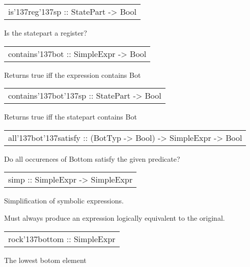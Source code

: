 \begin{haddockdesc}
\item[\begin{tabular}{@{}l}
is{\char '137}reg{\char '137}sp :: StatePart -> Bool
\end{tabular}]
{\haddockbegindoc
Is the statepart a register?\par}
\end{haddockdesc}
\begin{haddockdesc}
\item[\begin{tabular}{@{}l}
contains{\char '137}bot :: SimpleExpr -> Bool
\end{tabular}]
{\haddockbegindoc
Returns true iff the expression contains Bot\par}
\end{haddockdesc}
\begin{haddockdesc}
\item[\begin{tabular}{@{}l}
contains{\char '137}bot{\char '137}sp :: StatePart -> Bool
\end{tabular}]
{\haddockbegindoc
Returns true iff the statepart contains Bot\par}
\end{haddockdesc}
\begin{haddockdesc}
\item[\begin{tabular}{@{}l}
all{\char '137}bot{\char '137}satisfy :: (BotTyp -> Bool) -> SimpleExpr -> Bool
\end{tabular}]
{\haddockbegindoc
Do all occurences of Bottom satisfy the given predicate?\par}
\end{haddockdesc}
\begin{haddockdesc}
\item[\begin{tabular}{@{}l}
simp :: SimpleExpr -> SimpleExpr
\end{tabular}]
{\haddockbegindoc
Simplification of symbolic expressions. \par
Must always produce an expression logically equivalent to the original.\par}
\end{haddockdesc}
\begin{haddockdesc}
\item[\begin{tabular}{@{}l}
rock{\char '137}bottom :: SimpleExpr
\end{tabular}]
{\haddockbegindoc
The lowest botom element\par}
\end{haddockdesc}
